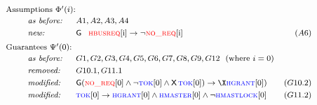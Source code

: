 \[ 
{\footnotesize
\begin{array}{rllr}


\multicolumn{4}{l}{\text{Assumptions $\Phi'(i)$:}}\\[2pt]
& \textit{~~~~as before: } & A1, A2, A3, A4 \\[3pt]

& \textit{~~~~new: } & \always~~ \hbusreqi \impl \neg \norequestsi & (A6)\\ [5pt]

\multicolumn{4}{l}{\text{Guarantees $\Psi'(0)$:}}\\[2pt]
& \textit{~~~~as before: } &  G1, G2, G3, G4, G5, G6, G7, G8, G9, G12 ~~ (\text{where $i=0$}) &  \\[3pt]

& \textit{~~~~removed: } & G10.1, G11.1\\[3pt]

& \textit{~~~~modified:} & \always (\norequests[0] \land \neg \tok[0] \land \nextt \tok[0])
  \impl
  \X \hgrant[0])& (G10.2) \\[3pt]

& \textit{~~~~modified:}& \tok[0]\impl\hgrant[0]\land\hmaster[0]\land\neg \hmastlock[0]  & (G11.2)

\end{array}
}
\]
